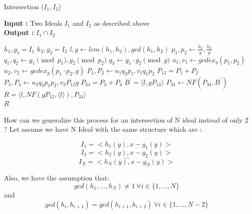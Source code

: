 \documentclass{article}
\begin{document}
\newpage
\begin{algorithm}
    \caption{Intersection ($I_{1}, I_{2}$)} \label{alg:intersect-2-ideals}
    \textbf{Input : }Two Ideals $I_{1}$ and $I_{2}$ as described above \\
    \textbf{Output : }$I_{1} \cap I_{2}$
\begin{algorithmic}
    \State $h_{1}, g_{1} = I_{1}$ 
    \State $h_{2}, g_{2} = I_{2}$ 
    \State $l, g \gets lcm(h_{1}, h_{2}), gcd(h_{1}, h_{2})$
    \State $p_{1}, p_{2} \gets \frac{h_{1}}{g}, \frac{h_{2}}{g}$
    \State $q_{1}, q_{2} \gets g_{1} \pmod {p_{1}}, g_{2} \pmod {p_{2}}$
    \State $q_{3} \gets g_{1} \cdot g_{2} \pmod {g}$ 
    \State $u_{1}, v_{1} \gets gcdex_{y} (p_{1}, p_{2})$ 
    \State $u_{2}, v_{2} \gets gcdex_{y} (p_{1} \cdot p_{2}, g)$ 
    \State $P_{1}, P_{2} \gets u_{1}q_{2}p_{1}, v_{1}q_{1}p_{2}$ 
    \State $P_{12} = P_{1} + P_{2}$
    \State $P_{3}, P_{4} \gets u_{2}q_{3}p_{1}p_{2}, v_{2}P_{12}g$
    \State $P_{34} = P_{3} + P_{4}$
    \State $B^{\prime} = \langle l, gP_{12} \rangle$
    \State $P_{34} \gets NF(P_{34}, B^{\prime})$
    \State $R = \langle l, NF(gP_{12}, \langle l \rangle), P_{34} \rangle$ \\
    \Return $R$
\end{algorithmic}
\end{algorithm}

How can we generalize this process for an intersection of N ideal instead of only 2 ?
Let assume we have N Ideal with the same structure which are : 

\[I_{1} = <h_{1}(y),x-g_{1}(y)>\]
\[I_{2} = <h_{2}(y),x-g_{2}(y)>\]
\[\dots\]
\[I_{N} = <h_{N}(y),x-g_{N}(y)>\]

Also, we have the assumption that: \[gcd(h_{1},...,h_{N})\neq1\ \forall i \in \{1,...,N\}\]
and \[gcd(h_{i},h_{i+1})=gcd(h_{i+1},h_{i+2})\ \forall i \in \{1,...,N-2\}\]
\end{document}
